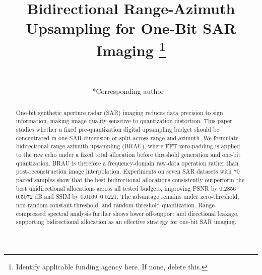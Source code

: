 \documentclass[conference]{IEEEtran}
\begin{document}
\title{Bidirectional Range-Azimuth Upsampling for One-Bit SAR Imaging
\thanks{Identify applicable funding agency here. If none, delete this.}
}

\author{
~\\
\and
{}
*Corresponding author
~\\
\and
{}
}

\maketitle

\begin{abstract}
One-bit synthetic aperture radar (SAR) imaging reduces data precision to sign information, making image quality sensitive to quantization distortion. This paper studies whether a fixed pre-quantization digital upsampling budget should be concentrated in one SAR dimension or split across range and azimuth. We formulate bidirectional range-azimuth upsampling (BRAU), where FFT zero-padding is applied to the raw echo under a fixed total allocation before threshold generation and one-bit quantization. BRAU is therefore a frequency-domain raw-data operation rather than post-reconstruction image interpolation. Experiments on seven SAR datasets with 70 paired samples show that the best bidirectional allocations consistently outperform the best unidirectional allocations across all tested budgets, improving PSNR by 0.2856--0.5072 dB and SSIM by 0.0169--0.0221. The advantage remains under zero-threshold, non-random constant-threshold, and random-threshold quantization. Range-compressed spectral analysis further shows lower off-support and directional leakage, supporting bidirectional allocation as an effective strategy for one-bit SAR imaging.
\end{abstract}
\end{document}

